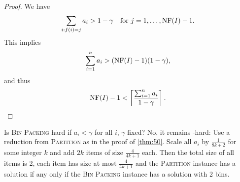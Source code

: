 \documentclass[../skript.tex]{subfiles}
\begin{document}
\begin{proof}\tabularnewline
We have
\[
	\sum_{i \mathrel{}:\mathrel{} f(i) = j} a_i > 1-\gamma \quad \text{for } j = 1, \ldots, \operatorname{NF}(I) -1.
\]
This implies
\[
	\sum_{i=1}^n a_i > (\operatorname{NF}(I) - 1)(1-\gamma),
\]
and thus
\[
	\operatorname{NF}(I) - 1 < \left\lceil \frac{\sum_{i=1}^n a_i}{1-\gamma} \right\rceil.
\]
\end{proof}
Is \textsc{Bin Packing} hard if $a_i < \gamma$ for all $i$, $\gamma$ fixed? No, it remains \NP-hard: Use a reduction from \textsc{Partition} as in the proof of \cref{thm:50}. Scale all $a_i$ by $\frac{1}{8k + 2}$ for some integer $k$ and add $2k$ items of size $\frac{4}{4k+1}$ each. Then the total size of all items is 2, each item has size at most $\frac{4}{4k + 1}$ and the \textsc{Partition} instance has a solution if any only if the \textsc{Bin Packing} instance has a solution with 2 bins.
\end{document}
